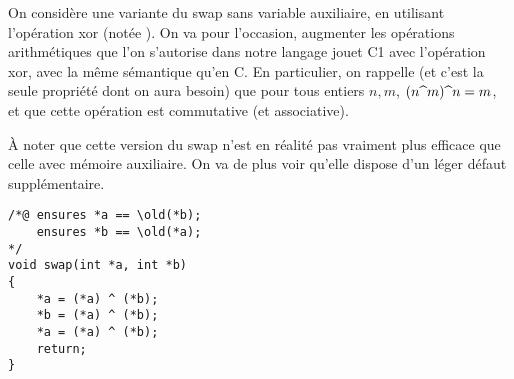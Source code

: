 \documentclass[11pt,answers]{exam}
\begin{document}
\begin{questions}

  
    On considère une variante du swap sans variable auxiliaire, en utilisant l’opération xor (notée \code{^}).
    On va pour l’occasion, augmenter les opérations arithmétiques que l’on s’autorise dans notre langage jouet C1 avec l’opération xor, avec la même sémantique qu’en C.
    En particulier, on rappelle (et c’est la seule propriété dont on aura besoin) que pour tous entiers $n,m$, $(n \code{^} m) \code{^} n = m$, et que cette opération est commutative (et associative).

    À noter que cette version du swap n’est en réalité pas vraiment plus efficace que celle avec mémoire auxiliaire. On va de plus voir qu’elle dispose d’un léger défaut supplémentaire.

        \begin{lstlisting}
/*@ ensures *a == \old(*b);
    ensures *b == \old(*a);
*/
void swap(int *a, int *b)
{
    *a = (*a) ^ (*b);
    *b = (*a) ^ (*b);
    *a = (*a) ^ (*b);
    return;
}
    \end{lstlisting}

\end{questions}
\end{document}
